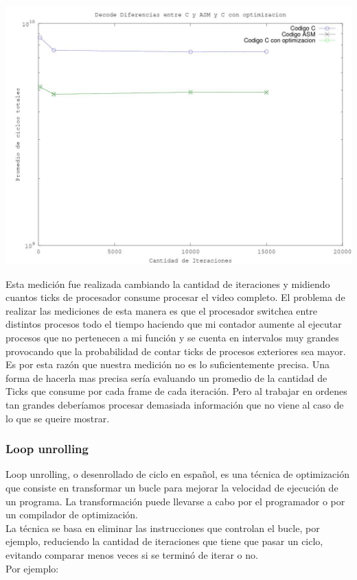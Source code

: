 \begin{itemize}
\begin{center}
 \includegraphics[scale=0.5]{imagenes/optimizacionC.jpg}
\end{center}

Esta medici\'on fue realizada cambiando la cantidad de iteraciones y midiendo cuantos ticks de procesador consume procesar el video completo. El 
problema de realizar las mediciones de esta manera es que el procesador switchea entre distintos procesos todo el tiempo haciendo que mi contador aumente
 al ejecutar procesos que no pertenecen a mi funci\'on y se cuenta en intervalos muy grandes provocando que la probabilidad de contar ticks de procesos
 exteriores sea mayor. Es por esta raz\'on que nuestra medici\'on no es lo suficientemente precisa. Una forma de hacerla mas precisa ser\'ia evaluando un
promedio de la cantidad de Ticks que consume por cada frame de cada iteraci\'on. Pero al trabajar en ordenes tan grandes deber\'iamos procesar demasiada
 informaci\'on que no viene al caso de lo que se queire mostrar.\newline

\end{itemize}

\subsubsection{Loop unrolling}
Loop unrolling, o desenrollado de ciclo en español, es una t\'ecnica de optimizaci\'on que consiste en transformar un bucle para mejorar la velocidad de ejecuci\'on de un programa. La transformaci\'on puede llevarse a cabo por el programador o por un compilador de optimizaci\'on.\\
La t\'ecnica se basa en eliminar las instrucciones que controlan el bucle, por ejemplo, reduciendo la cantidad de iteraciones que tiene que pasar un ciclo, evitando comparar menos veces si se termin\'o de iterar o no.\\
Por ejemplo:

